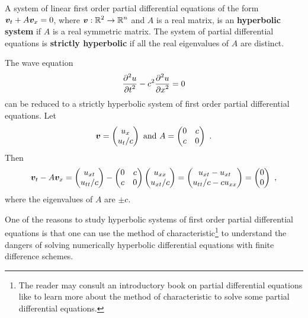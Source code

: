 \begin{defn}
A system of linear first order partial differential equations of the
form $\displaystyle   \bm{v}_t + A \bm{v}_x = 0$,
where $\displaystyle \bm{v}: \mathbb{R}^2 \rightarrow \mathbb{R}^n$ and $A$ is a
\nn real matrix, is an {\bfseries hyperbolic system} if $A$ is a \nn real symmetric
matrix\footnotemark.  The system of partial
differential equations is
{\bfseries strictly hyperbolic} if all the real eigenvalues of
$A$ are distinct.
\end{defn}


The wave equation
\[
\frac{\displaystyle \partial^{2}{u}} {\displaystyle \partial{t}^{2}} - c^2 \frac{\displaystyle \partial^{2}{u}} {\displaystyle \partial{x}^{2}} = 0
\]
can be reduced to a strictly hyperbolic system of first order partial
differential equations.  Let
\[
\VEC{v} =
\begin{pmatrix}
u_x \\ u_t/c
\end{pmatrix}
\ \text{and} \ 
A = \begin{pmatrix}
0 & c \\
c & 0
\end{pmatrix} \ .
\]
Then
\[
\bm{v}_t - A \bm{v}_x
=
\begin{pmatrix}
 u_{xt} \\ u_{tt}/c
\end{pmatrix}
-
\begin{pmatrix}
0 & c \\
c & 0
\end{pmatrix}
\begin{pmatrix}
u_{xx} \\ u_{xt}/c
\end{pmatrix}
=
\begin{pmatrix}
 u_{xt} - u_{xt} \\
u_{tt}/c - c u_{xx}
\end{pmatrix}
=
\begin{pmatrix}
 0 \\ 0
\end{pmatrix} \ ,
\]
where the eigenvalues of $A$ are $\pm c$.

One of the reasons to study hyperbolic systems of first order partial
differential equations is that one can use the method of
characteristic\footnote{The reader may consult an introductory book on
partial differential equations like \cite{Str} to learn more about the
method of characteristic to solve some partial differential
equations.} to understand the dangers of solving numerically
hyperbolic differential equations with finite difference schemes.

